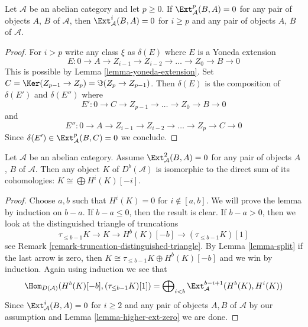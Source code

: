 \begin{lemma}
\label{lemma-higher-ext-zero}
Let $\mathcal{A}$ be an abelian category and let $p \geq 0$.
If $\Ext^p_\mathcal{A}(B, A) = 0$ for any pair of objects $A$, $B$
of $\mathcal{A}$, then $\Ext^i_\mathcal{A}(B, A) = 0$ for
$i \geq p$ and any pair of objects $A$, $B$ of $\mathcal{A}$.
\end{lemma}

\begin{proof}
For $i > p$ write any class $\xi$ as $\delta(E)$
where $E$ is a Yoneda extension
$$
E : 0 \to A \to Z_{i - 1} \to Z_{i - 2} \to \ldots \to Z_0 \to B \to 0
$$
This is possible by Lemma \ref{lemma-yoneda-extension}.
Set $C = \Ker(Z_{p - 1} \to Z_p) = \Im(Z_p \to Z_{p - 1})$.
Then $\delta(E)$ is the composition of $\delta(E')$ and $\delta(E'')$
where
$$
E' : 0 \to C \to Z_{p - 1} \to \ldots \to Z_0 \to B \to 0
$$
and
$$
E'' : 0 \to A \to Z_{i - 1} \to Z_{i - 2} \to \ldots \to Z_p \to C \to 0
$$
Since $\delta(E') \in \Ext^p_\mathcal{A}(B, C) = 0$
we conclude.
\end{proof}

\begin{lemma}
\label{lemma-ext-2-zero}
Let $\mathcal{A}$ be an abelian category. Assume $\Ext^2_\mathcal{A}(B, A) = 0$
for any pair of objects $A$, $B$ of $\mathcal{A}$.
Then any object $K$ of $D^b(\mathcal{A})$ is isomorphic to the direct
sum of its cohomologies: $K \cong \bigoplus H^i(K)[-i]$.
\end{lemma}

\begin{proof}
Choose $a, b$ such that $H^i(K) = 0$ for $i \not \in [a, b]$.
We will prove the lemma by induction on $b - a$. If $b - a \leq 0$,
then the result is clear. If $b - a > 0$, then we look at the
distinguished triangle of truncations
$$
\tau_{\leq b - 1}K \to K \to H^b(K)[-b] \to (\tau_{\leq b - 1}K)[1]
$$
see Remark \ref{remark-truncation-distinguished-triangle}.
By Lemma \ref{lemma-split} if the last arrow is zero, then
$K \cong \tau_{\leq b - 1}K \oplus H^b(K)[-b]$ and we win
by induction. Again using induction we see that
$$
\Hom_{D(\mathcal{A})}(H^b(K)[-b], (\tau_{\leq b - 1}K)[1]) =
\bigoplus\nolimits_{i < b} \Ext_\mathcal{A}^{b - i + 1}(H^b(K), H^i(K))
$$
Since $\Ext^i_\mathcal{A}(B, A) = 0$ for $i \geq 2$
and any pair of objects $A, B$ of $\mathcal{A}$ by
our assumption and Lemma \ref{lemma-higher-ext-zero} we are done.
\end{proof}






